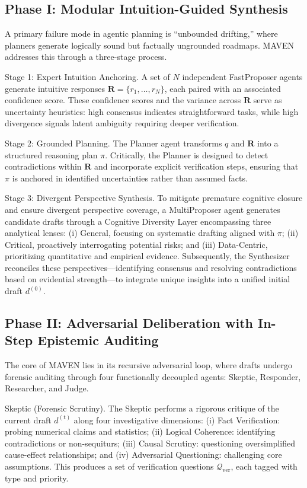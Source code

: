 \documentclass{article}
\begin{document}
\subsection{Phase I: Modular Intuition-Guided Synthesis}
\label{subsec:phase1}

A primary failure mode in agentic planning is ``unbounded drifting,'' where planners generate logically sound but factually ungrounded roadmaps. MAVEN addresses this through a three-stage process.

Stage 1: Expert Intuition Anchoring. A set of $N$ independent FastProposer agents generate intuitive responses $\mathbf{R} = \{r_1, \ldots, r_N\}$, each paired with an associated confidence score. These confidence scores and the variance across $\mathbf{R}$ serve as uncertainty heuristics: high consensus indicates straightforward tasks, while high divergence signals latent ambiguity requiring deeper verification.

Stage 2: Grounded Planning. The Planner agent transforms $q$ and $\mathbf{R}$ into a structured reasoning plan $\pi$. Critically, the Planner is designed to detect contradictions within $\mathbf{R}$ and incorporate explicit verification steps, ensuring that $\pi$ is anchored in identified uncertainties rather than assumed facts.

Stage 3: Divergent Perspective Synthesis. To mitigate premature cognitive closure  and ensure divergent perspective coverage, a MultiProposer agent generates candidate drafts through a Cognitive Diversity Layer encompassing three analytical lenses: (i) General, focusing on systematic drafting aligned with $\pi$; (ii) Critical, proactively interrogating potential risks; and (iii) Data-Centric, prioritizing quantitative and empirical evidence. Subsequently, the Synthesizer reconciles these perspectives—identifying consensus and resolving contradictions based on evidential strength—to integrate unique insights into a unified initial draft $d^{(0)}$.

\subsection{Phase II: Adversarial Deliberation with In-Step Epistemic Auditing}
\label{subsec:phase2}

The core of MAVEN lies in its recursive adversarial loop, where drafts undergo forensic auditing through four functionally decoupled agents: Skeptic, Responder, Researcher, and Judge.

Skeptic (Forensic Scrutiny).
The Skeptic performs a rigorous critique of the current draft $d^{(t)}$ along four investigative dimensions: (i) Fact Verification: probing numerical claims and statistics; (ii) Logical Coherence: identifying contradictions or non-sequiturs; (iii) Causal Scrutiny: questioning oversimplified cause-effect relationships; and (iv) Adversarial Questioning: challenging core assumptions. This produces a set of verification questions $\mathcal{Q}_{\text{ver}}$, each tagged with type and priority.
\end{document}
